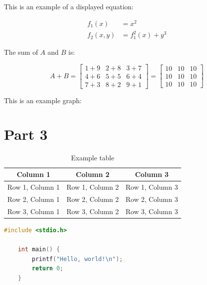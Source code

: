 \documentclass[12pt,a4paper]{report}
\begin{document}
This is an example of a displayed equation:

\begin{align}
    f_1(x)   & = x^2            \\
    f_2(x,y) & = f_1^2(x) + y^3
\end{align}

The sum of $A$ and $B$ is:

\[
    A + B = \begin{bmatrix}
        1+9 & 2+8 & 3+7 \\
        4+6 & 5+5 & 6+4 \\
        7+3 & 8+2 & 9+1
    \end{bmatrix}
    = \begin{bmatrix}
        10 & 10 & 10 \\
        10 & 10 & 10 \\
        10 & 10 & 10
    \end{bmatrix}
\]

This is an example graph:
\begin{center}
\end{center}

\section{Part 3}
\begin{table}[h]
    \centering
    \begin{tabular}{|c|c|c|}
        \hline
        \textbf{Column 1} & \textbf{Column 2} & \textbf{Column 3} \\
        \hline
        Row 1, Column 1   & Row 1, Column 2   & Row 1, Column 3   \\
        \hline
        Row 2, Column 1   & Row 2, Column 2   & Row 2, Column 3   \\
        \hline
        Row 3, Column 1   & Row 3, Column 2   & Row 3, Column 3   \\
        \hline
    \end{tabular}
    \caption{Example table}
\end{table}

\begin{lstlisting}[language=C++, caption=Example C++ code]
    #include <stdio.h>

    int main() {
        printf("Hello, world!\n");
        return 0;
    }
\end{lstlisting}
\end{document}
